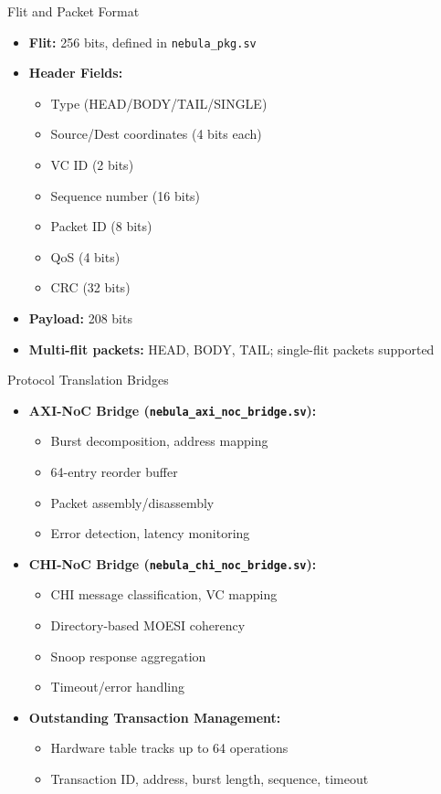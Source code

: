 \documentclass{beamer}
\begin{document}
\begin{frame}{Flit and Packet Format}
  \begin{itemize}
    \item \textbf{Flit:} 256 bits, defined in \texttt{nebula\_pkg.sv}
    \item \textbf{Header Fields:}
      \begin{itemize}
        \item Type (HEAD/BODY/TAIL/SINGLE)
        \item Source/Dest coordinates (4 bits each)
        \item VC ID (2 bits)
        \item Sequence number (16 bits)
        \item Packet ID (8 bits)
        \item QoS (4 bits)
        \item CRC (32 bits)
      \end{itemize}
    \item \textbf{Payload:} 208 bits
    \item \textbf{Multi-flit packets:} HEAD, BODY, TAIL; single-flit packets supported
  \end{itemize}
\end{frame}

\begin{frame}{Protocol Translation Bridges}
  \begin{itemize}
    \item \textbf{AXI-NoC Bridge (\texttt{nebula\_axi\_noc\_bridge.sv}):}
      \begin{itemize}
        \item Burst decomposition, address mapping
        \item 64-entry reorder buffer
        \item Packet assembly/disassembly
        \item Error detection, latency monitoring
      \end{itemize}
    \item \textbf{CHI-NoC Bridge (\texttt{nebula\_chi\_noc\_bridge.sv}):}
      \begin{itemize}
        \item CHI message classification, VC mapping
        \item Directory-based MOESI coherency
        \item Snoop response aggregation
        \item Timeout/error handling
      \end{itemize}
    \item \textbf{Outstanding Transaction Management:}
      \begin{itemize}
        \item Hardware table tracks up to 64 operations
        \item Transaction ID, address, burst length, sequence, timeout
      \end{itemize}
  \end{itemize}
\end{frame}
\end{document}
